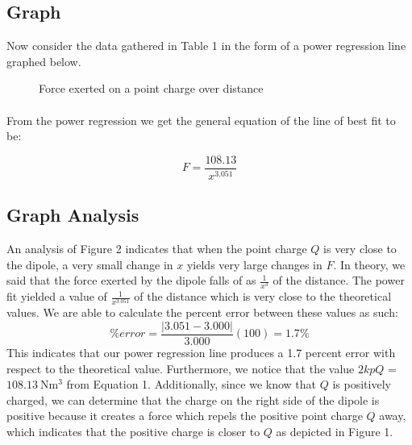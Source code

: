 \documentclass[12pt]{article}
\newcommand{\norm}[1]{\lvert #1 \rvert}
\begin{document}
\subsection{Graph}
Now consider the data gathered in Table 1 in the form of a power regression line graphed below.

\begin{figure}[H]
    \centering

    \caption[10pt]{Force exerted on a point charge over distance}

\end{figure}

\paragraph{}

From the power regression we get the general equation of the line of best fit to be:

\[F=\frac{108.13}{x^{3.051}}\]

\subsection{Graph Analysis}
An analysis of Figure 2 indicates that when the point charge $Q$ is very close to the dipole, a very small change in $x$ yields very large changes in $F$. In theory, we said that the force exerted by the dipole falls of as $\frac{1}{x^3}$ of the distance. The power fit yielded a value of $\frac{1}{x^{3.051}}$ of the distance which is very close to the theoretical values. We are able to calculate the percent error between these values as such:
\[\%error = \frac{\norm{3.051-3.000}}{3.000} (100) = 1.7\%\]
This indicates that our power regression line produces a 1.7 percent error with respect to the theoretical value. Furthermore, we notice that the value $2kpQ$ = $\SI{108.13}{\newton\metre\cubed}$ from Equation 1. Additionally, since we know that $Q$ is positively charged, we can determine that the charge on the right side of the dipole is positive because it creates a force which repels the positive point charge $Q$ away, which indicates that the positive charge is closer to $Q$ as depicted in Figure 1.
\end{document}

